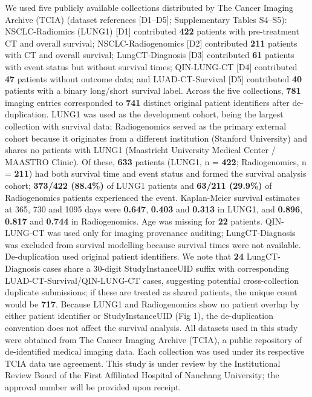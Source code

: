 \documentclass[a4paper,fleqn]{cas-sc}
\begin{document}
We used five publicly available collections distributed by The Cancer Imaging Archive (TCIA) (dataset references [D1--D5]; Supplementary Tables S4--S5): NSCLC-Radiomics (LUNG1) [D1] contributed \textbf{422} patients with pre-treatment CT and overall survival; NSCLC-Radiogenomics [D2] contributed \textbf{211} patients with CT and overall survival; LungCT-Diagnosis [D3] contributed \textbf{61} patients with event status but without survival times; QIN-LUNG-CT [D4] contributed \textbf{47} patients without outcome data; and LUAD-CT-Survival [D5] contributed \textbf{40} patients with a binary long/short survival label. Across the five collections, \textbf{781} imaging entries corresponded to \textbf{741} distinct original patient identifiers after de-duplication. LUNG1 was used as the development cohort, being the largest collection with survival data; Radiogenomics served as the primary external cohort because it originates from a different institution (Stanford University) and shares no patients with LUNG1 (Maastricht University Medical Center / MAASTRO Clinic). Of these, \textbf{633} patients (LUNG1, n = \textbf{422}; Radiogenomics, n = \textbf{211}) had both survival time and event status and formed the survival analysis cohort; \textbf{373/422 (88.4\%)} of LUNG1 patients and \textbf{63/211 (29.9\%)} of Radiogenomics patients experienced the event. Kaplan-Meier survival estimates at 365, 730 and 1095 days were \textbf{0.647}, \textbf{0.403} and \textbf{0.313} in LUNG1, and \textbf{0.896}, \textbf{0.817} and \textbf{0.744} in Radiogenomics. Age was missing for \textbf{22} patients. QIN-LUNG-CT was used only for imaging provenance auditing; LungCT-Diagnosis was excluded from survival modelling because survival times were not available. De-duplication used original patient identifiers. We note that \textbf{24} LungCT-Diagnosis cases share a 30-digit StudyInstanceUID suffix with corresponding LUAD-CT-Survival/QIN-LUNG-CT cases, suggesting potential cross-collection duplicate submissions; if these are treated as shared patients, the unique count would be \textbf{717}. Because LUNG1 and Radiogenomics show no patient overlap by either patient identifier or StudyInstanceUID (Fig 1), the de-duplication convention does not affect the survival analysis. All datasets used in this study were obtained from The Cancer Imaging Archive (TCIA), a public repository of de-identified medical imaging data. Each collection was used under its respective TCIA data use agreement. This study is under review by the Institutional Review Board of the First Affiliated Hospital of Nanchang University; the approval number will be provided upon receipt.
\end{document}
